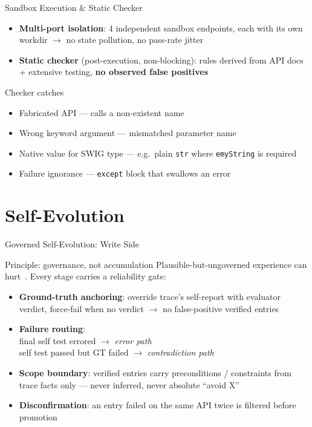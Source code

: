 \documentclass{beamer}
\begin{document}
\begin{frame}{Sandbox Execution \& Static Checker}
    \begin{itemize}
        \item \textbf{Multi-port isolation}: 4 independent sandbox endpoints, each with its own workdir $\to$ no state pollution, no pass-rate jitter
        \item \textbf{Static checker} (post-execution, non-blocking): rules derived from API docs + extensive testing, \textbf{no observed false positives}
    \end{itemize}
    \vspace{4pt}
    \begin{exampleblock}{Checker catches}
        \begin{itemize}
            \item Fabricated API --- calls a non-existent name
            \item Wrong keyword argument --- mismatched parameter name
            \item Native value for SWIG type --- e.g.\ plain \texttt{str} where \texttt{emyString} is required
            \item Failure ignorance --- \texttt{except} block that swallows an error
        \end{itemize}
    \end{exampleblock}
\end{frame}

\section{Self-Evolution}

\begin{frame}{Governed Self-Evolution: Write Side}
    \begin{block}{Principle: governance, not accumulation}
        Plausible-but-ungoverned experience can hurt~\cite{zhao2024expel,yang2026skillopt}. Every stage carries a reliability gate:
    \end{block}
    \begin{itemize}
        \item \textbf{Ground-truth anchoring}: override trace's self-report with evaluator verdict, force-fail when no verdict $\to$ no false-positive verified entries
        \item \textbf{Failure routing}: \\
        final self test errored $\to$ \emph{error path} \\
        self test passed but GT failed $\to$ \emph{contradiction path}
        \item \textbf{Scope boundary}: verified entries carry preconditions / constraints from trace facts only --- never inferred, never absolute ``avoid X''
        \item \textbf{Disconfirmation}: an entry failed on the same API twice is filtered before promotion
    \end{itemize}
\end{frame}
\end{document}
